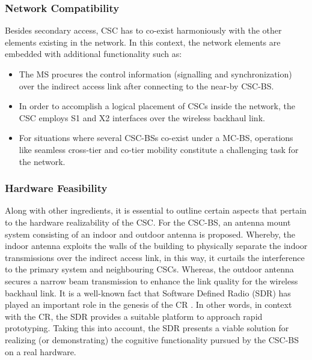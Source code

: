 \subsubsection*{Network Compatibility}
Besides secondary access, CSC has to co-exist harmoniously with the other elements existing in the network. In this context, the network elements are embedded with additional functionality such as:
\begin{itemize}
\item The MS procures the control information (signalling and synchronization) over the indirect access link after connecting to the near-by CSC-BS.
\item In order to accomplish a logical placement of CSCs inside the network, the CSC employs S1 and X2 interfaces over the wireless backhaul link.
\item For situations where several CSC-BSs co-exist under a MC-BS, operations like seamless cross-tier and co-tier mobility constitute a challenging task for the network.
\end{itemize}


\subsubsection*{Hardware Feasibility}
Along with other ingredients, it is essential to outline certain aspects that pertain to the hardware realizability of the CSC. For the CSC-BS, an antenna mount system consisting of an indoor and outdoor antenna is proposed. Whereby, the indoor antenna exploits the walls of the building to physically separate the indoor transmissions over the indirect access link, in this way, it curtails the interference to the primary system and neighbouring CSCs. Whereas, the outdoor antenna secures a narrow beam transmission to enhance the link quality for the wireless backhaul link. It is a well-known fact that Software Defined Radio (SDR) has played an important role in the genesis of the CR \cite{Jondral05}. In other words, in context with the CR, the SDR provides a suitable platform to approach rapid prototyping. Taking this into account, the SDR presents a viable solution for realizing (or demonstrating) the cognitive functionality pursued by the CSC-BS on a real hardware.


